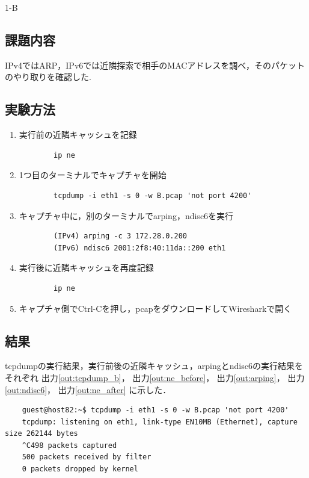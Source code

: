 \begin{maintask}{1-B}
  \subsection*{課題内容}
  IPv4ではARP，IPv6では近隣探索で相手のMACアドレスを調べ，そのパケットのやり取りを確認した.

  \subsection*{実験方法}
  \begin{enumerate}
    \item 実行前の近隣キャッシュを記録
      \begin{verbatim}
        ip ne
      \end{verbatim}

    \item 1つ目のターミナルでキャプチャを開始
      \begin{verbatim}
        tcpdump -i eth1 -s 0 -w B.pcap 'not port 4200'
      \end{verbatim}

    \item キャプチャ中に，別のターミナルでarping，ndisc6を実行
      \begin{verbatim}
        (IPv4) arping -c 3 172.28.0.200
        (IPv6) ndisc6 2001:2f8:40:11da::200 eth1
      \end{verbatim}

    \item 実行後に近隣キャッシュを再度記録
      \begin{verbatim}
        ip ne
      \end{verbatim}

    \item キャプチャ側でCtrl-Cを押し，pcapをダウンロードしてWiresharkで開く
  \end{enumerate}

  \subsection*{結果}
  tcpdumpの実行結果，実行前後の近隣キャッシュ，arpingとndisc6の実行結果をそれぞれ
  出力\ref{out:tcpdump_b}，
  出力\ref{out:ne_before}，
  出力\ref{out:arping}，
  出力\ref{out:ndisc6}，
  出力\ref{out:ne_after}
  に示した．

  \begin{termout}[H]
    \caption{tcpdump の実行結果}\label{out:tcpdump_b}
    \begin{verbatim}
    guest@host82:~$ tcpdump -i eth1 -s 0 -w B.pcap 'not port 4200'
    tcpdump: listening on eth1, link-type EN10MB (Ethernet), capture size 262144 bytes
    ^C498 packets captured
    500 packets received by filter
    0 packets dropped by kernel
    \end{verbatim}
  \end{termout}


\end{maintask}
